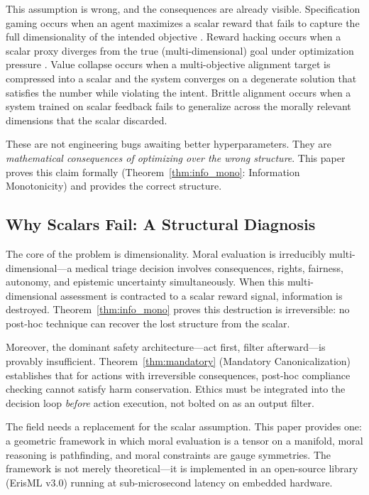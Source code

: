 \documentclass[12pt,letterpaper]{article}
\theoremstyle{definition}
\theoremstyle{remark}
\begin{document}
This assumption is wrong, and the consequences are already visible. Specification gaming occurs when an agent maximizes a scalar reward that fails to capture the full dimensionality of the intended objective \cite{krakovna2020}. Reward hacking occurs when a scalar proxy diverges from the true (multi-dimensional) goal under optimization pressure \cite{skalse2022}. Value collapse occurs when a multi-objective alignment target is compressed into a scalar and the system converges on a degenerate solution that satisfies the number while violating the intent. Brittle alignment occurs when a system trained on scalar feedback fails to generalize across the morally relevant dimensions that the scalar discarded.

These are not engineering bugs awaiting better hyperparameters. They are \emph{mathematical consequences of optimizing over the wrong structure}. This paper proves this claim formally (Theorem~\ref{thm:info_mono}: Information Monotonicity) and provides the correct structure.

\subsection{Why Scalars Fail: A Structural Diagnosis}

The core of the problem is dimensionality. Moral evaluation is irreducibly multi-dimensional---a medical triage decision involves consequences, rights, fairness, autonomy, and epistemic uncertainty simultaneously. When this multi-dimensional assessment is contracted to a scalar reward signal, information is destroyed. Theorem~\ref{thm:info_mono} proves this destruction is irreversible: no post-hoc technique can recover the lost structure from the scalar.

Moreover, the dominant safety architecture---act first, filter afterward---is provably insufficient. Theorem~\ref{thm:mandatory} (Mandatory Canonicalization) establishes that for actions with irreversible consequences, post-hoc compliance checking cannot satisfy harm conservation. Ethics must be integrated into the decision loop \emph{before} action execution, not bolted on as an output filter.

The field needs a replacement for the scalar assumption. This paper provides one: a geometric framework in which moral evaluation is a tensor on a manifold, moral reasoning is pathfinding, and moral constraints are gauge symmetries. The framework is not merely theoretical---it is implemented in an open-source library (ErisML v3.0) running at sub-microsecond latency on embedded hardware.
\end{document}
